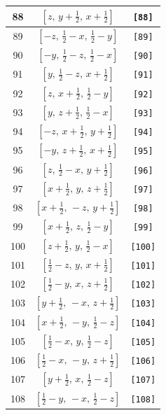 \documentclass[fleqn,8pt]{jsarticle}
\begin{document}
\begin{longtable}{ccc}
88 & $\left[ z,\, y + \frac{1}{2},\, x + \frac{1}{2} \right]$ & {\tt [88]} \\ \hline
89 & $\left[ - z,\, \frac{1}{2} - x,\, \frac{1}{2} - y \right]$ & {\tt [89]} \\ \hline
90 & $\left[ - y,\, \frac{1}{2} - z,\, \frac{1}{2} - x \right]$ & {\tt [90]} \\ \hline
91 & $\left[ y,\, \frac{1}{2} - z,\, x + \frac{1}{2} \right]$ & {\tt [91]} \\ \hline
92 & $\left[ z,\, x + \frac{1}{2},\, \frac{1}{2} - y \right]$ & {\tt [92]} \\ \hline
93 & $\left[ y,\, z + \frac{1}{2},\, \frac{1}{2} - x \right]$ & {\tt [93]} \\ \hline
94 & $\left[ - z,\, x + \frac{1}{2},\, y + \frac{1}{2} \right]$ & {\tt [94]} \\ \hline
95 & $\left[ - y,\, z + \frac{1}{2},\, x + \frac{1}{2} \right]$ & {\tt [95]} \\ \hline
96 & $\left[ z,\, \frac{1}{2} - x,\, y + \frac{1}{2} \right]$ & {\tt [96]} \\ \hline
97 & $\left[ x + \frac{1}{2},\, y,\, z + \frac{1}{2} \right]$ & {\tt [97]} \\ \hline
98 & $\left[ x + \frac{1}{2},\, - z,\, y + \frac{1}{2} \right]$ & {\tt [98]} \\ \hline
99 & $\left[ x + \frac{1}{2},\, z,\, \frac{1}{2} - y \right]$ & {\tt [99]} \\ \hline
100 & $\left[ z + \frac{1}{2},\, y,\, \frac{1}{2} - x \right]$ & {\tt [100]} \\ \hline
101 & $\left[ \frac{1}{2} - z,\, y,\, x + \frac{1}{2} \right]$ & {\tt [101]} \\ \hline
102 & $\left[ \frac{1}{2} - y,\, x,\, z + \frac{1}{2} \right]$ & {\tt [102]} \\ \hline
103 & $\left[ y + \frac{1}{2},\, - x,\, z + \frac{1}{2} \right]$ & {\tt [103]} \\ \hline
104 & $\left[ x + \frac{1}{2},\, - y,\, \frac{1}{2} - z \right]$ & {\tt [104]} \\ \hline
105 & $\left[ \frac{1}{2} - x,\, y,\, \frac{1}{2} - z \right]$ & {\tt [105]} \\ \hline
106 & $\left[ \frac{1}{2} - x,\, - y,\, z + \frac{1}{2} \right]$ & {\tt [106]} \\ \hline
107 & $\left[ y + \frac{1}{2},\, x,\, \frac{1}{2} - z \right]$ & {\tt [107]} \\ \hline
108 & $\left[ \frac{1}{2} - y,\, - x,\, \frac{1}{2} - z \right]$ & {\tt [108]} \\ \hline

\end{longtable}
\end{document}
